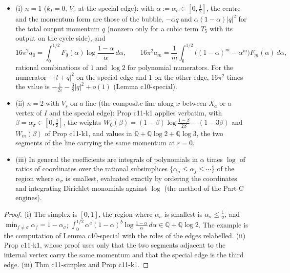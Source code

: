\begin{proposition}
\label{prop:qs-small}
\begin{itemize}
\item (i) $n=1$ ($k_I=0$, $V_s$ at the special edge): with $\alpha:=\alpha_\sigma\in[0,\tfrac12]$, the centre and the momentum form are those of the bubble, $-\alpha q$ and $\alpha(1-\alpha)|q|^2$ for the total output momentum $q$ (nonzero only for a cubic term $T_5$ with its output on the cycle side), and
\[
16\pi^2a_0=\int_0^{1/2}F_0(\alpha)\log\frac{1-\alpha}\alpha\,d\alpha,\qquad 16\pi^2a_m=\frac1m\int_0^{1/2}\big((1-\alpha)^m-\alpha^m\big)F_m(\alpha)\,d\alpha ,
\]
rational combinations of $1$ and $\log2$ for polynomial numerators. For the numerator $-|l+q|^2$ on the special edge and $1$ on the other edge, $16\pi^2$ times the value is $-\frac1{2\varepsilon}-\frac38|q|^2+o(1)$ (Lemma c10-special).
\item (ii) $n=2$ with $V_s$ on a line (the composite line along $x$ between $X_a$ or a vertex of $I$ and the special edge): Prop c11-k1 applies verbatim, with $\beta=\alpha_\sigma\in[0,\tfrac13]$, the weights $W_0(\beta)=(1-\beta)\log\frac{1-\beta}{2\beta}-(1-3\beta)$ and $W_m(\beta)$ of Prop c11-k1, and values in $\mathbb Q+\mathbb Q\log2+\mathbb Q\log3$, the two segments of the line carrying the same momentum at $r=0$.
\item (iii) In general the coefficients are integrals of polynomials in $\alpha$ times $\log$ of ratios of coordinates over the rational subsimplices $\{\alpha_\sigma\le\alpha_f\le\cdots\}$ of the region where $\alpha_\sigma$ is smallest, evaluated exactly by ordering the coordinates and integrating Dirichlet monomials against $\log$ (the method of the Part-C engines).
\end{itemize}
\end{proposition}

\begin{proof}
(i) The simplex is $[0,1]$, the region where $\alpha_\sigma$ is smallest is $\alpha_\sigma\le\tfrac12$, and $\min_{f\ne\sigma}\alpha_f=1-\alpha_\sigma$; $\int_0^{1/2}\alpha^a(1-\alpha)^b\log\frac{1-\alpha}\alpha\,d\alpha\in\mathbb Q+\mathbb Q\log2$. The example is the computation of Lemma c10-special with the roles of the edges relabelled. (ii) Prop c11-k1, whose proof uses only that the two segments adjacent to the internal vertex carry the same momentum and that the special edge is the third edge. (iii) Thm c11-simplex and Prop c11-k1.
\end{proof}

